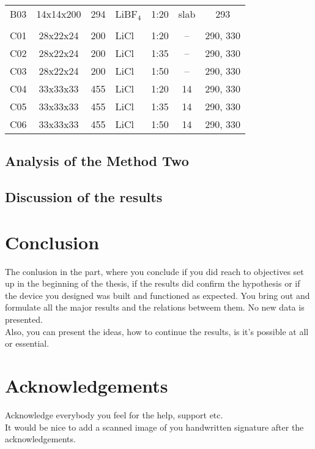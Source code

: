 \documentclass[12pt]{report}
\begin{document}
\begin{table}[h]
\begin{center}
\begin{tabular}{l | c r l c c c}
B03 & 14x14x200 & 294 & LiBF$_{4}$ & 1:20 & slab & 293      \\
\\
C01 & 28x22x24  & 200 & LiCl       & 1:20 & --   & 290, 330 \\
C02 & 28x22x24  & 200 & LiCl       & 1:35 & --   & 290, 330 \\
C03 & 28x22x24  & 200 & LiCl       & 1:50 & --   & 290, 330 \\
C04 & 33x33x33  & 455 & LiCl       & 1:20 & 14   & 290, 330 \\
C05 & 33x33x33  & 455 & LiCl       & 1:35 & 14   & 290, 330 \\
C06 & 33x33x33  & 455 & LiCl       & 1:50 & 14   & 290, 330 \\
\hline
\hline
\end{tabular}
\end{center}
\end{table}
\lipsum[18]
\section{Analysis of the Method Two}
\lipsum[19]
\section{Discussion of the results}
\lipsum[1]
\chapter{Conclusion}
The conlusion in the part, where you conclude if you did reach to objectives set up in the beginning of the thesis, if the results did confirm the hypothesis or if the device you designed was built and functioned as expected. You bring out and formulate all the major results and the relations betweem them. No new data is presented.
\\[5mm]
Also, you can present the ideas, how to continue the results, is it's possible at all or essential.
\lipsum[20]
\chapter*{Acknowledgements}

Acknowledge everybody you feel for the help, support etc.
\\[5mm]
It would be nice to add a scanned image of you handwritten signature after the acknowledgements.
\end{document}

